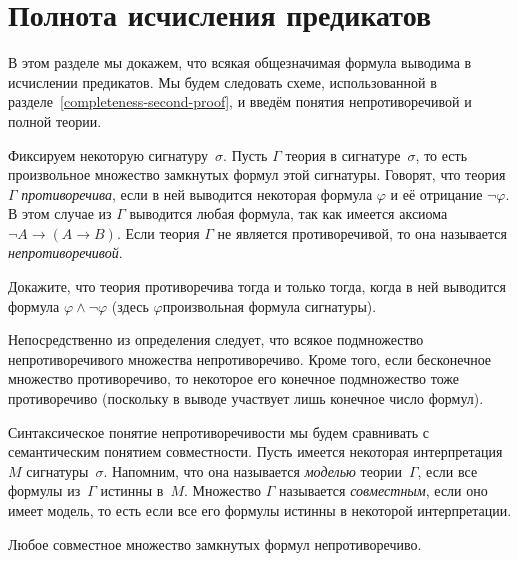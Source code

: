 \section{Полнота исчисления предикатов}
        \label{predicate-completeness}
В этом разделе мы докажем, что всякая общезначимая формула
выводима в исчислении предикатов. Мы будем следовать схеме,
использованной в разделе~\ref{completeness-second-proof},
и введём понятия непротиворечивой и полной теории.

Фиксируем некоторую сигнатуру~$\sigma$. Пусть $\Gamma$\т
теория в сигнатуре~$\sigma$, то есть произвольное
множество замкнутых формул этой сигнатуры.
Говорят, что теория $\Gamma$ \emph{противоречива},%
если в ней выводится
некоторая формула $\varphi$ и её отрицание $\lnot\varphi$. В
этом случае из $\Gamma$ выводится любая формула, так как имеется
аксиома $\lnot A \to (A \to B)$. Если теория $\Gamma$ не
является противоречивой, то она называется
\emph{непротиворечивой}.%

\begin{problem}
Докажите, что теория противоречива тогда и только тогда, когда в
ней выводится формула $\varphi\land\lnot\varphi$ (здесь
$\varphi$\т произвольная формула сигнатуры).
\end{problem}

Непосредственно из определения следует, что всякое подмножество
непротиворечивого множества непротиворечиво. Кроме того, если
бесконечное множество противоречиво, то некоторое его конечное
подмножество тоже противоречиво (поскольку в выводе участвует
лишь конечное число формул).

Синтаксическое понятие непротиворечивости мы будем сравнивать с
семантическим понятием совместности. Пусть имеется некоторая
интерпретация~$M$ сигнатуры~$\sigma$. Напомним, что она называется
\emph{моделью}%
теории~$\Gamma$, если все формулы из~$\Gamma$ истинны в~$M$.
Множество $\Gamma$ называется \emph{совместным},%
если оно имеет модель, то есть если все его формулы истинны в
некоторой интерпретации.

\begin{theorem}
        \label{correctness-second-reformulation}%
%
Любое совместное множество замкнутых формул
непротиворечиво.
\end{theorem}

